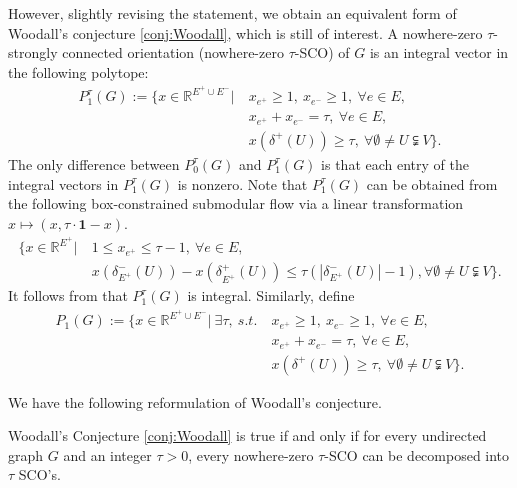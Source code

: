 \documentclass[runningheads]{llncs}
\begin{document}
However, slightly revising the statement, we obtain an equivalent form of Woodall's conjecture \ref{conj:Woodall}, which is still of interest. A nowhere-zero $\tau$-strongly connected orientation (nowhere-zero $\tau$-SCO) of $G$ is an integral vector in the following polytope:
\begin{equation}
    \begin{aligned}
        P_1^\tau(G):=\big\{x\in\mathbb{R}^{E^+\cup E^-}\big|~&x_{e^+}\geq 1,~ x_{e^-}\geq 1, ~\forall e\in E,\\
        &x_{e^+}+x_{e^-}=\tau,~\forall e\in E,\\
        &x(\delta^+(U))\geq \tau,~ \forall \emptyset \neq U\subsetneqq V\big\}.
    \end{aligned}
\end{equation}
The only difference between $P_0^\tau(G)$ and $P_1^\tau(G)$ is that each entry of the integral vectors in $P_1^\tau(G)$ is nonzero. Note that $P_1^\tau(G)$ can be obtained from the following box-constrained submodular flow via a linear transformation $x\mapsto (x,\tau\cdot\mathbf{1}-x)$.
\begin{equation*}
    \begin{aligned}
        \big\{x\in\mathbb{R}^{E^+}\big|~&1\leq x_{e^+}\leq \tau-1,~\forall e\in E,\\
        &x(\delta_{E^+}^-(U))-x(\delta_{E^+}^+(U))\leq \tau(|\delta_{E^+}^-(U)|-1), \forall \emptyset \neq U\subsetneqq V\big\}.
    \end{aligned}
\end{equation*}
It follows from  that $P_1^\tau(G)$ is integral.
Similarly, define
    \begin{equation}\label{eq:def_P1}
    \begin{aligned}
        P_1(G):=\big\{x\in\mathbb{R}^{E^+\cup E^-}\big|~\exists \tau, ~s.t. ~&x_{e^+}\geq 1,~ x_{e^-}\geq 1, ~\forall e\in E,\\
        &x_{e^+}+x_{e^-}=\tau,~\forall e\in E,\\
        &x(\delta^+(U))\geq \tau,~ \forall \emptyset \neq U\subsetneqq V\big\}.
    \end{aligned}
    \end{equation}

We have the following reformulation of Woodall's conjecture.


\begin{theorem}\label{thm:eq_Woodall}
Woodall's Conjecture \ref{conj:Woodall} is true if and only if for every undirected graph $G$ and an integer $\tau>0$, every nowhere-zero $\tau$-SCO can be decomposed into $\tau$ SCO's.
\end{theorem}
\end{document}
